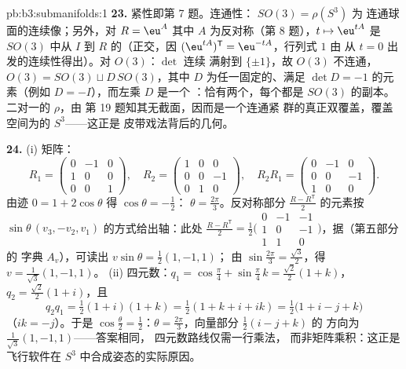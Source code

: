 \begin{solution}{pb:b3:submanifolds:1}
\textbf{23.} 紧性即第 7 题。连通性：
$SO(3) = \rho(S^3)$ 为
连通球面的连续像；另外，对 $R = \eu^{A}$
其中 $A$ 为反对称（第 8 题），$t \mapsto \eu^{tA}$
是 $SO(3)$ 中从 $I$ 到 $R$ 的（正交，因
$(\eu^{tA})^{\mathsf T} = \eu^{-tA}$，行列式 $1$ 由
从 $t = 0$ 出发的连续性得出）。对 $O(3)$：$\det$ 连续
满射到 $\{\pm1\}$，故 $O(3)$ 不连通，$O(3) = SO(3)
\sqcup D\,SO(3)$，其中 $D$ 为任一固定的、满足 $\det D = -1$
的元素（例如 $D = -I$），而左乘 $D$ 是一个
：恰有两个，每个都是
$SO(3)$ 的副本。二对一的 $\rho$，由
第 19 题知其无截面，因而是一个连通紧
群的真正双覆盖，覆盖空间为的 $S^3$——这正是
皮带戏法背后的几何。

\textbf{24.} (i) 矩阵：
\[
R_1 = \begin{pmatrix} 0 & -1 & 0\\ 1 & 0 & 0\\ 0 & 0 & 1
\end{pmatrix},
\quad
R_2 = \begin{pmatrix} 1 & 0 & 0\\ 0 & 0 & -1\\ 0 & 1 & 0
\end{pmatrix},
\quad
R_2R_1 = \begin{pmatrix} 0 & -1 & 0\\ 0 & 0 & -1\\ 1 & 0 &
0\end{pmatrix}.
\]
由迹 $0 = 1 + 2\cos\theta$ 得 $\cos\theta = -\frac12$：
$\theta = \frac{2\pi}3$。反对称部分 $\frac{R -
R^{\mathsf T}}2$ 的元素按 $\sin\theta\,(v_3,
-v_2, v_1)$ 的方式给出轴：此处 $\frac{R - R^{\mathsf T}}2 =
\frac12\bigl(\begin{smallmatrix}0 & -1 & -1\\ 1 & 0 & -1\\ 1
& 1 & 0\end{smallmatrix}\bigr)$，据（第五部分的
字典 $A_v$），可读出 $v\sin\theta = \frac12(1, -1, 1)$；
由 $\sin\frac{2\pi}3 = \frac{\sqrt3}2$，得 $v = \frac1{\sqrt3}(1,
-1, 1)$。
(ii) 四元数：$q_1 = \cos\frac\pi4 + \sin\frac\pi4\,k =
\frac{\sqrt2}2(1 + k)$，$q_2 = \frac{\sqrt2}2(1 + i)$，且
\[
q_2q_1 = \tfrac12(1 + i)(1 + k) = \tfrac12(1 + k + i + ik)
= \tfrac12\bigl(1 + i - j + k\bigr)
\]
（$ik = -j$）。于是 $\cos\frac\theta2 = \frac12$：$\theta =
\frac{2\pi}3$，向量部分 $\frac12(i - j + k)$ 的
方向为 $\frac1{\sqrt3}(1, -1, 1)$——答案相同，
四元数路线仅需一行乘法，
而非矩阵乘积：这正是
飞行软件在 $S^3$ 中合成姿态的实际原因。


\end{solution}
